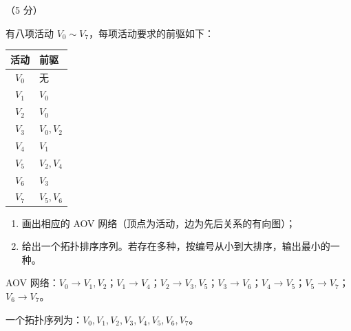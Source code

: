 \begin{question}（5 分）

有八项活动 $V_0\sim V_7$，每项活动要求的前驱如下：

\begin{center}
\small
\begin{tabular}{@{}c l@{}}
\toprule
活动 & 前驱\\
\midrule
$V_0$ & 无\\
$V_1$ & $V_0$\\
$V_2$ & $V_0$\\
$V_3$ & $V_0,V_2$\\
$V_4$ & $V_1$\\
$V_5$ & $V_2,V_4$\\
$V_6$ & $V_3$\\
$V_7$ & $V_5,V_6$\\
\bottomrule
\end{tabular}
\end{center}

\begin{enumerate}[label=(\arabic*)]
  \item 画出相应的 AOV 网络（顶点为活动，边为先后关系的有向图）；
  \item 给出一个拓扑排序序列。若存在多种，按编号从小到大排序，输出最小的一种。
\end{enumerate}

\begin{solution}
AOV 网络：$V_0\to V_1,V_2$；$V_1\to V_4$；$V_2\to V_3,V_5$；$V_3\to V_6$；$V_4\to V_5$；$V_5\to V_7$；$V_6\to V_7$。

一个拓扑序列为：$V_0,V_1,V_2,V_3,V_4,V_5,V_6,V_7$。
\end{solution}
\end{question}

